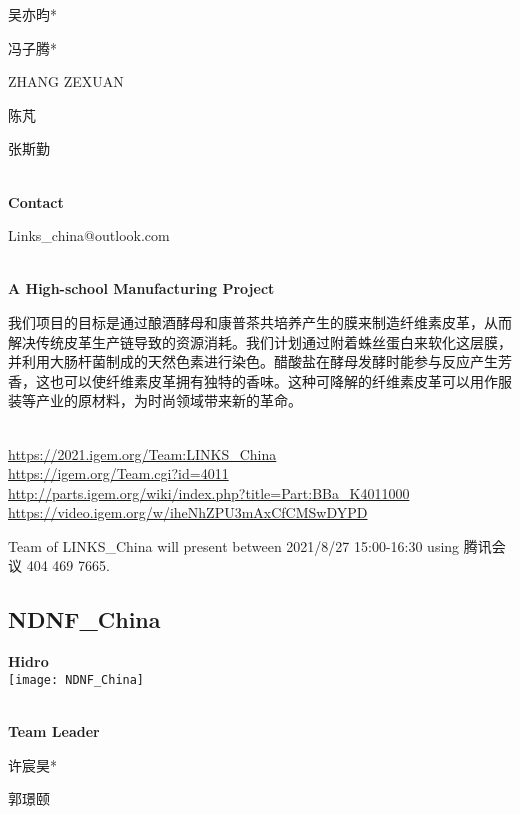   吴亦昀*

  冯子腾*

  ZHANG ZEXUAN

  陈芃

  张斯勤


\textbf{\\Contact}

  Links\_china@outlook.com


\textbf{\\A High-school Manufacturing Project\\}\begin{spacing}{1.5}

我们项目的目标是通过酿酒酵母和康普茶共培养产生的膜来制造纤维素皮革，从而解决传统皮革生产链导致的资源消耗。我们计划通过附着蛛丝蛋白来软化这层膜，并利用大肠杆菌制成的天然色素进行染色。醋酸盐在酵母发酵时能参与反应产生芳香，这也可以使纤维素皮革拥有独特的香味。这种可降解的纤维素皮革可以用作服装等产业的原材料，为时尚领域带来新的革命。\end{spacing}
\\

\url{https://2021.igem.org/Team:LINKS\_China }\\
\url{https://igem.org/Team.cgi?id=4011 }\\
\url{http://parts.igem.org/wiki/index.php?title=Part:BBa_K4011000 }\\
\url{https://video.igem.org/w/iheNhZPU3mAxCfCMSwDYPD }\\

\vfill{}









Team of LINKS\_China will present between  2021/8/27 15:00-16:30       using 腾讯会议 404 469 7665.
\newpage


\subsection{\textcolor{Blu}{ NDNF\_China } }
\vspace{5mm}
\begin{center}
\large{
  \textbf{ Hidro }\\
  \texttt{[image: NDNF\_China]}
}
\end{center}
\textbf{\\Team Leader}

  许宸昊*

  郭璟颐


